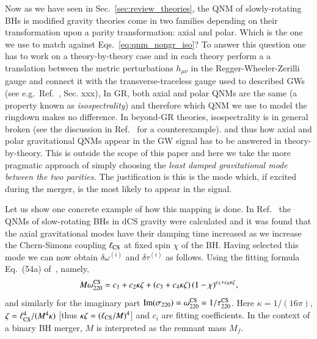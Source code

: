 \documentclass[twocolumn,prd,aps,superscriptaddress,preprintnumbers,tightenlines,showpacs,nofootinbib,eqsecnum,amsfonts,amsmath,longbibliography]{revtex4-1}
\newcommand{\Mf}{M_f}
\begin{document}
Now as we have seen in Sec.~\ref{sec:review_theories}, the QNM of slowly-rotating BHs
is modified gravity theories come in two families depending on their transformation upon a parity
transformation: axial and polar. Which is the one we use to match against Eqs.~\eqref{eq:qnm_nongr_iso}?
%
To answer this question one has to work on a theory-by-theory case and in each theory perform a
a translation between the metric perturbations $h_{\mu\nu}$ in the Regger-Wheeler-Zerilli gauge and
connect it with the transverse-traceless gauge used to described GWs (see e.g.~Ref.~\cite{Maggiore:2018sht}, Sec. xxx),
%
In GR, both axial and polar QNMs are the same (a property known as \emph{isospectrality}) and therefore which
QNM we use to model the ringdown makes no difference.
%
In beyond-GR theories, isospectrality is in general broken (see the discussion in Ref.~\cite{Hui:2021cpm} for a counterexample).
and thus how axial and polar gravitational QNMs appear in the GW signal has to be answered in theory-by-theory.
%
This is outside the scope of this paper and here we take the more pragmatic approach
of simply choosing the \emph{least damped gravitational mode between the two parities.}
%
The justification is this is the mode which, if excited during the merger, is
the most likely to appear in the signal.

Let us show one concrete example of how this mapping is done.
%
In Ref.~\cite{Wagle:2021tam} the QNMs of slow-rotating BHs in dCS gravity were calculated
and it was found that the axial gravitational modes have their damping time increased as we
increase the Chern-Simons coupling $\ell_{\rm CS}$ at fixed spin $\chi$ of the BH.
%
Having selected this mode we can now obtain $\delta\omega^{(i)}$ and $\delta\tau^{(i)}$ as follows.
%
Using the fitting formula Eq.~(54a) of~\cite{Wagle:2021tam}, namely,
%
\begin{equation}
    M \omega^{\rm CS}_{220} = c_{1} + c_{2} \kappa \zeta + (c_{3} + c_{4} \kappa \zeta) \, (1 - \chi)^{c_{5} + c_{6} \kappa \zeta},
    \label{eq:omega_dsc_eg}
\end{equation}
%
and similarly for the imaginary part ${\rm Im}(\sigma_{220}) = \omega^{\rm CS}_{220} = 1 / \tau^{\rm CS}_{220}$.
%
Here $\kappa = 1/(16 \pi)$, $\zeta = \ell_{\rm CS}^{4} / (M^4 \kappa)$ [thus $\kappa \zeta = (\ell_{\rm CS} / M)^4$]
and $c_{i}$ are fitting coefficients.
%
In the context of a binary BH merger, $M$ is interpreted as the remnant mass $\Mf$.
\end{document}

